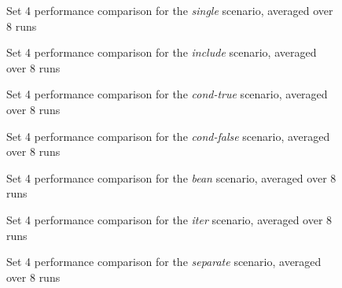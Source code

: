 \begin{figure}[!p]
\centering

\caption{\label{multi:set4-single}Set 4 performance comparison for the \emph{single} scenario, averaged over 8 runs}
\end{figure}

\begin{figure}[!p]
\centering

\caption{\label{multi:set4-include}Set 4 performance comparison for the \emph{include} scenario, averaged over 8 runs}
\end{figure}

\begin{figure}[!p]
\centering

\caption{\label{multi:set4-cond-true}Set 4 performance comparison for the \emph{cond-true} scenario, averaged over 8 runs}
\end{figure}

\begin{figure}[!p]
\centering

\caption{\label{multi:set4-cond-false}Set 4 performance comparison for the \emph{cond-false} scenario, averaged over 8 runs}
\end{figure}

\begin{figure}[!p]
\centering

\caption{\label{multi:set4-bean}Set 4 performance comparison for the \emph{bean} scenario, averaged over 8 runs}
\end{figure}

\begin{figure}[!p]
\centering

\caption{\label{multi:set4-iter}Set 4 performance comparison for the \emph{iter} scenario, averaged over 8 runs}
\end{figure}

\begin{figure}[!p]
\centering

\caption{\label{multi:set4-separate}Set 4 performance comparison for the \emph{separate} scenario, averaged over 8 runs}
\end{figure}

